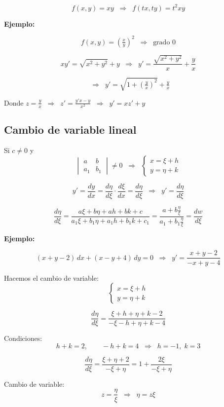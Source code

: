 \documentclass[a4paper,12pt]{article}
\begin{document}
\[
f(x,y) = xy \;\;\Rightarrow\;\; f(tx,ty) = t^2 xy
\]

\textbf{Ejemplo:}

\[
f(x,y) = \left(\tfrac{x}{y}\right)^2 \;\;\Rightarrow\;\; \text{grado 0}
\]

\[
x y' = \sqrt{x^2 + y^2} + y 
\;\;\Rightarrow\;\;
y' = \frac{\sqrt{x^2 + y^2}}{x} + \frac{y}{x}
\]

\[
\;\;\Rightarrow\;\; y' = \sqrt{1 + \left(\tfrac{y}{x}\right)^2} + \tfrac{y}{x}
\]

Donde $z = \tfrac{y}{x} \;\;\Rightarrow\;\; z' = \tfrac{y'x - y}{x^2} \;\;\Rightarrow\;\; y' = x z' + y$

\subsection{Cambio de variable lineal}

Si $c \neq 0$ y 
\[
\begin{vmatrix}
a & b \\
a_1 & b_1
\end{vmatrix} \neq 0
\;\;\Rightarrow\;\;
\begin{cases}
x = \xi + h \\
y = \eta + k
\end{cases}
\]

\[
y' = \frac{dy}{dx} = \frac{d\eta}{d\xi}\cdot \frac{d\xi}{dx} 
= \frac{d\eta}{d\xi} \;\;\Rightarrow\;\; y' = \frac{d\eta}{d\xi}
\]

\[
\frac{d\eta}{d\xi} = 
\frac{a\xi + b\eta + ah + bk + c}{a_1\xi + b_1\eta + a_1 h + b_1 k + c_1}
= \frac{a + b\frac{\eta}{\xi}}{a_1 + b_1\frac{\eta}{\xi}}
= \frac{dw}{d\xi}
\]

\textbf{Ejemplo:}

\[
(x+y-2)\,dx + (x-y+4)\,dy = 0
\;\;\Rightarrow\;\;
y' = \frac{x+y-2}{-x+y-4}
\]

Hacemos el cambio de variable:
\[
\begin{cases}
x = \xi + h \\
y = \eta + k
\end{cases}
\]

\[
\frac{d\eta}{d\xi} = \frac{\xi + h + \eta + k - 2}{-\xi - h + \eta + k - 4}
\]

Condiciones:
\[
h+k=2, 
\qquad 
-h+k=4
\;\;\Rightarrow\;\;
h=-1, \; k=3
\]

\[
\frac{d\eta}{d\xi} = \frac{\xi + \eta + 2}{-\xi + \eta}
= 1 + \frac{2\xi}{-\xi + \eta}
\]

Cambio de variable:
\[
z = \frac{\eta}{\xi} \;\;\Rightarrow\;\; \eta = z\xi
\]
\end{document}
